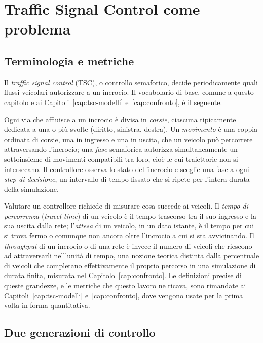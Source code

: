 \section{Traffic Signal Control come problema}
\label{sec:background-tsc}

\subsection{Terminologia e metriche}
\label{subsec:tsc-terminologia}

Il \emph{traffic signal control} (TSC), o controllo semaforico, decide
periodicamente quali flussi veicolari autorizzare a un incrocio. Il
vocabolario di base, comune a questo capitolo e ai
Capitoli~\ref{cap:tsc-modelli} e~\ref{cap:confronto}, è il seguente.

Ogni via che affluisce a un incrocio è divisa in \emph{corsie}, ciascuna
tipicamente dedicata a una o più svolte (diritto, sinistra, destra). Un
\emph{movimento} è una coppia ordinata di corsie, una in ingresso e una
in uscita, che un veicolo può percorrere attraversando l'incrocio; una
\emph{fase} semaforica autorizza simultaneamente un sottoinsieme di
movimenti compatibili tra loro, cioè le cui traiettorie non si
intersecano. Il controllore osserva lo stato dell'incrocio e sceglie una
fase a ogni \emph{step di decisione}, un intervallo di tempo fissato che
si ripete per l'intera durata della simulazione.

Valutare un controllore richiede di misurare cosa succede ai veicoli. Il
\emph{tempo di percorrenza} (\emph{travel time}) di un veicolo è il tempo
trascorso tra il suo ingresso e la sua uscita dalla rete; l'\emph{attesa}
di un veicolo, in un dato istante, è il tempo per cui si trova fermo o
comunque non ancora oltre l'incrocio a cui si sta avvicinando. Il
\emph{throughput} di un incrocio o di una rete è invece il numero di
veicoli che riescono ad attraversarli nell'unità di tempo, una nozione
teorica distinta dalla percentuale di veicoli che completano
effettivamente il proprio percorso in una simulazione di durata finita,
misurata nel Capitolo~\ref{cap:confronto}. Le definizioni precise di
queste grandezze, e le metriche che questo lavoro ne ricava, sono
rimandate ai Capitoli~\ref{cap:tsc-modelli} e~\ref{cap:confronto}, dove
vengono usate per la prima volta in forma quantitativa.

\subsection{Due generazioni di controllo}
\label{subsec:tsc-generations}

